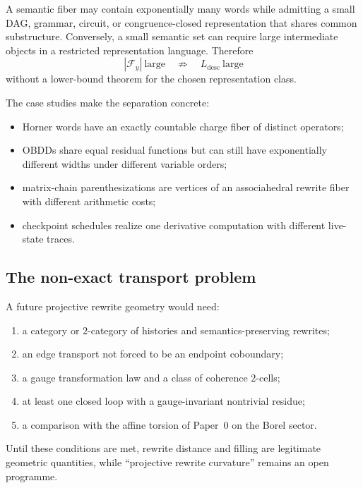 A semantic fiber may contain exponentially many words while admitting a small
DAG, grammar, circuit, or congruence-closed representation that shares common
substructure.  Conversely, a small semantic set can require large intermediate
objects in a restricted representation language.  Therefore
\[
  |\mathcal F_y|\ \text{large}
  \quad\not\Longrightarrow\quad
  L_{\mathrm{desc}}\ \text{large}
\]
without a lower-bound theorem for the chosen representation class.

The case studies make the separation concrete:

\begin{itemize}
  \item Horner words have an exactly countable charge fiber of distinct
  operators;
  \item OBDDs share equal residual functions but can still have exponentially
  different widths under different variable orders;
  \item matrix-chain parenthesizations are vertices of an associahedral
  rewrite fiber with different arithmetic costs;
  \item checkpoint schedules realize one derivative computation with different
  live-state traces.
\end{itemize}

\subsection{The non-exact transport problem}

A future projective rewrite geometry would need:

\begin{enumerate}
  \item a category or $2$-category of histories and semantics-preserving
  rewrites;
  \item an edge transport not forced to be an endpoint coboundary;
  \item a gauge transformation law and a class of coherence $2$-cells;
  \item at least one closed loop with a gauge-invariant nontrivial residue;
  \item a comparison with the affine torsion of Paper~0 on the Borel sector.
\end{enumerate}

Until these conditions are met, rewrite distance and filling are legitimate
geometric quantities, while ``projective rewrite curvature'' remains an open
programme.
